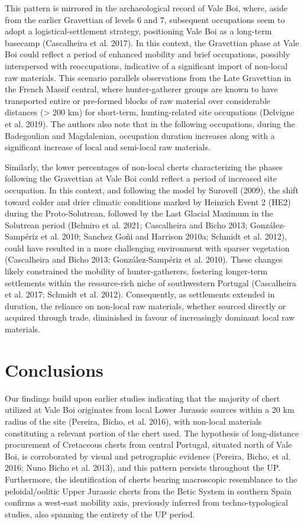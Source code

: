 \documentclass[
  a4paper,
  DIV=11,
  numbers=noendperiod]{scrreprt}
\begin{document}
This pattern is mirrored in the archaeological record of Vale Boi,
where, aside from the earlier Gravettian of levels 6 and 7, subsequent
occupations seem to adopt a logistical-settlement strategy, positioning
Vale Boi as a long-term basecamp (Cascalheira et al. 2017). In this
context, the Gravettian phase at Vale Boi could reflect a period of
enhanced mobility and brief occupations, possibly interspersed with
reoccupations, indicative of a significant import of non-local raw
materials. This scenario parallels observations from the Late Gravettian
in the French Massif central, where hunter-gatherer groups are known to
have transported entire or pre-formed blocks of raw material over
considerable distances (\textgreater{} 200 km) for short-term,
hunting-related site occupations (Delvigne et al. 2019). The authors
also note that in the following occupations, during the Badegoulian and
Magdalenian, occupation duration increases along with a significant
increase of local and semi-local raw materials.

Similarly, the lower percentages of non-local cherts characterizing the
phases following the Gravettian at Vale Boi could reflect a period of
increased site occupation. In this context, and following the model by
Surovell (2009), the shift toward colder and drier climatic conditions
marked by Heinrich Event 2 (HE2) during the Proto-Solutrean, followed by
the Last Glacial Maximum in the Solutrean period (Belmiro et al. 2021;
Cascalheira and Bicho 2013; González-Sampériz et al. 2010; Sanchez Goñi
and Harrison 2010a; Schmidt et al. 2012), could have resulted in a more
challenging environment with sparser vegetation (Cascalheira and Bicho
2013; González-Sampériz et al. 2010). These changes likely constrained
the mobility of hunter-gatherers, fostering longer-term settlements
within the resource-rich niche of southwestern Portugal (Cascalheira et
al. 2017; Schmidt et al. 2012). Consequently, as settlements extended in
duration, the reliance on non-local raw materials, whether sourced
directly or acquired through trade, diminished in favour of increasingly
dominant local raw materials.

\section{Conclusions}\label{conclusions}

Our findings build upon earlier studies indicating that the majority of
chert utilized at Vale Boi originates from local Lower Jurassic sources
within a 20 km radius of the site (Pereira, Bicho, et al. 2016), with
non-local materials constituting a relevant portion of the chert used.
The hypothesis of long-distance procurement of Cretaceous cherts from
central Portugal, situated north of Vale Boi, is corroborated by visual
and petrographic evidence (Pereira, Bicho, et al. 2016; Nuno Bicho et
al. 2013), and this pattern persists throughout the UP. Furthermore, the
identification of cherts bearing macroscopic resemblance to the
peloidal/oolitic Upper Jurassic cherts from the Betic System in southern
Spain confirms a west-east mobility axis, previously inferred from
techno-typological studies, also spanning the entirety of the UP period.
\end{document}
